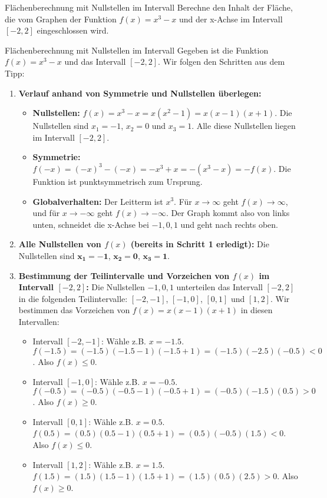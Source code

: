 \begin{aufgabenumgebung}{Flächenberechnung mit Nullstellen im Intervall}
Berechne den Inhalt der Fläche, die vom Graphen der Funktion $f(x) = x^3 - x$ und der x-Achse im Intervall $[-2, 2]$ eingeschlossen wird.
\end{aufgabenumgebung}

\begin{loesungsumgebung}{Flächenberechnung mit Nullstellen im Intervall}
Gegeben ist die Funktion $f(x) = x^3 - x$ und das Intervall $[-2, 2]$. Wir folgen den Schritten aus dem Tipp:

\begin{enumerate}
    \item \textbf{Verlauf anhand von Symmetrie und Nullstellen überlegen:}
    \begin{itemize}
        \item \textbf{Nullstellen:} $f(x) = x^3 - x = x(x^2-1) = x(x-1)(x+1)$.
        Die Nullstellen sind $x_1 = -1$, $x_2 = 0$ und $x_3 = 1$. Alle diese Nullstellen liegen im Intervall $[-2, 2]$.
        \item \textbf{Symmetrie:} $f(-x) = (-x)^3 - (-x) = -x^3 + x = -(x^3-x) = -f(x)$.
        Die Funktion ist punktsymmetrisch zum Ursprung.
        \item \textbf{Globalverhalten:} Der Leitterm ist $x^3$. Für $x \to \infty$ geht $f(x) \to \infty$, und für $x \to -\infty$ geht $f(x) \to -\infty$.
        Der Graph kommt also von links unten, schneidet die x-Achse bei $-1, 0, 1$ und geht nach rechts oben.
    \end{itemize}

    \item \textbf{Alle Nullstellen von $f(x)$ (bereits in Schritt 1 erledigt):}
    Die Nullstellen sind $\mathbf{x_1 = -1}$, $\mathbf{x_2 = 0}$, $\mathbf{x_3 = 1}$.

    \item \textbf{Bestimmung der Teilintervalle und Vorzeichen von $f(x)$ im Intervall $[-2, 2]$:}
    Die Nullstellen $-1, 0, 1$ unterteilen das Intervall $[-2, 2]$ in die folgenden Teilintervalle:
    $[-2, -1]$, $[-1, 0]$, $[0, 1]$ und $[1, 2]$.
    Wir bestimmen das Vorzeichen von $f(x) = x(x-1)(x+1)$ in diesen Intervallen:
    \begin{itemize}
        \item Intervall $[-2, -1]$: Wähle z.B. $x=-1.5$.
        $f(-1.5) = (-1.5)(-1.5-1)(-1.5+1) = (-1.5)(-2.5)(-0.5) < 0$. Also $f(x) \le 0$.
        \item Intervall $[-1, 0]$: Wähle z.B. $x=-0.5$.
        $f(-0.5) = (-0.5)(-0.5-1)(-0.5+1) = (-0.5)(-1.5)(0.5) > 0$. Also $f(x) \ge 0$.
        \item Intervall $[0, 1]$: Wähle z.B. $x=0.5$.
        $f(0.5) = (0.5)(0.5-1)(0.5+1) = (0.5)(-0.5)(1.5) < 0$. Also $f(x) \le 0$.
        \item Intervall $[1, 2]$: Wähle z.B. $x=1.5$.
        $f(1.5) = (1.5)(1.5-1)(1.5+1) = (1.5)(0.5)(2.5) > 0$. Also $f(x) \ge 0$.
    \end{itemize}


\end{enumerate}
\end{loesungsumgebung}
